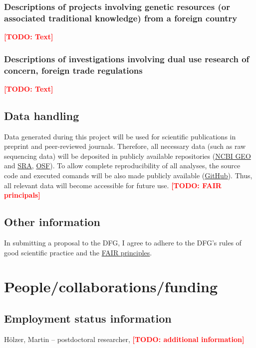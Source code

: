 \documentclass{scrartcl}
\newcommand{\todo}[1]{\xspace{\textcolor{red}{\bfseries[TODO: #1]}}\xspace}
\begin{document}
\subsubsection{Descriptions of projects involving genetic resources (or associated traditional knowledge) from a foreign country}
\todo{Text}

\subsubsection{Descriptions of investigations involving dual use research of concern, foreign trade regulations}
\todo{Text}


\subsection{Data handling}
Data generated during this project will be used for scientific publications in
preprint and peer-reviewed journals. Therefore, all necessary data (such as raw
sequencing data) will be deposited in publicly available repositories
(\href{https://www.ncbi.nlm.nih.gov/geo/}{NCBI GEO} and
\href{https://www.ncbi.nlm.nih.gov/sra}{SRA}, \href{https://osf.io/}{OSF}). To
allow complete reproducibility of all analyses, the source code and executed
comands will be also made publicly available
(\href{https://github.com/}{GitHub}).  Thus, all relevant data will become
accessible for future use. 
\todo{FAIR principals}

\subsection{Other information}
In submitting a proposal to the DFG, I agree to adhere to the DFG's rules of good scientific practice and the \href{https://www.nature.com/articles/sdata201618}{FAIR principles}.



\section{People/collaborations/funding}

\subsection{Employment status information}
H\"olzer, Martin -- postdoctoral researcher, \todo{additional information}
\end{document}
